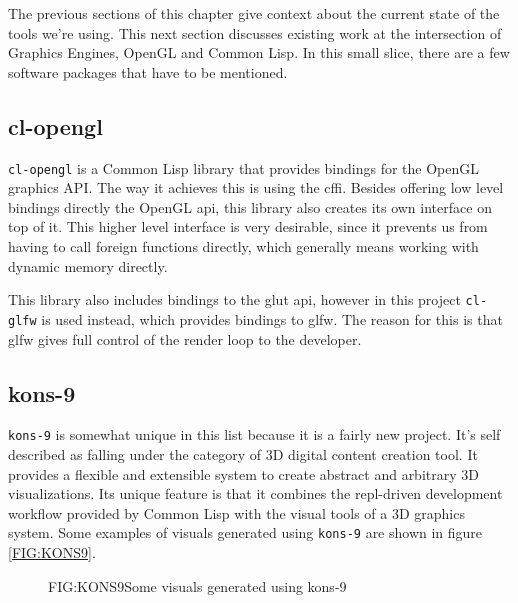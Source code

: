 
\label{SEC:SOTA}

The previous sections of this chapter give context about the current state of the tools we're using.
This next section discusses existing work at the intersection of Graphics Engines, OpenGL and Common Lisp.
In this small slice,
there are a few software packages that have to be mentioned.

\subsection{cl-opengl}


\texttt{cl-opengl}\cite{clopengl} is a Common Lisp library that provides bindings for the OpenGL graphics API.
The way it achieves this is using the \ac{cffi}.
Besides offering low level bindings directly the OpenGL \ac{api},
this library also creates its own interface on top of it.
This higher level interface is very desirable,
since it prevents us from having to call foreign functions directly,
which generally means working with dynamic memory directly\cite{cffi}.

This library also includes bindings to the \ac{glut} \ac{api},
however in this project \texttt{cl-glfw} is used instead,
which provides bindings to \ac{glfw}.
The reason for this is that \ac{glfw} gives full control of the render loop to the developer.

\subsection{kons-9}

\texttt{kons-9}\cite{kons9} is somewhat unique in this list because it is a fairly new project.
It's self described as falling under the category of 3D digital content creation tool.
It provides a flexible and extensible system to create abstract and arbitrary 3D visualizations.
Its unique feature is that it combines the \ac{repl}-driven development workflow provided by Common Lisp with the visual tools of a 3D graphics system.
Some examples of visuals generated using \texttt{kons-9} are shown in figure \ref{FIG:KONS9}.

\begin{figure}[Kons-9 example]{FIG:KONS9}{Some visuals generated using kons-9}
\end{figure}

